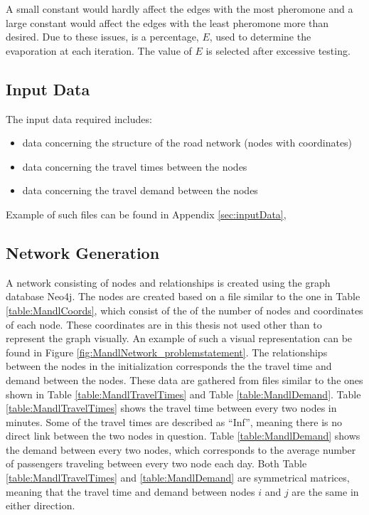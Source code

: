 A small constant would hardly affect the edges with the most pheromone and a large constant would affect the edges with the least pheromone more than desired. Due to these issues, is a percentage, $E$, used to determine the evaporation at each iteration. The value of $E$ is selected after excessive testing.

\subsection{Input Data}
The input data required includes:
\begin{itemize}
\item data concerning the structure of the road network (nodes with coordinates)
\item data concerning the travel times between the nodes
\item data concerning the travel demand between the nodes
\end{itemize}
Example of such files can be found in Appendix \vref{sec:inputData},

\subsection{Network Generation}
\label{subsec:networkGeneration}

A network consisting of nodes and relationships is created using the graph database Neo4j. The nodes are created based on a file similar to the one in Table \vref{table:MandlCoords}, which consist of the of the number of nodes and coordinates of each node. These coordinates are in this thesis not used other than to represent the graph visually. An example of such a visual representation can be found in Figure \vref{fig:MandlNetwork_problemstatement}. The relationships between the nodes in the initialization corresponds the the travel time and demand between the nodes. These data are gathered from files similar to the ones shown in Table 
\vref{table:MandlTravelTimes} and Table \vref{table:MandlDemand}. Table \ref{table:MandlTravelTimes} shows the travel time between every two nodes in minutes. Some of the travel times are described as ``Inf'', meaning there is no direct link between the two nodes in question. Table \ref{table:MandlDemand} shows the demand between every two nodes, which corresponds to the average number of passengers traveling between every two node each day. Both Table \ref{table:MandlTravelTimes} and \ref{table:MandlDemand} are symmetrical matrices, meaning that the travel time and demand between nodes $i$ and $j$ are the same in either direction. 

